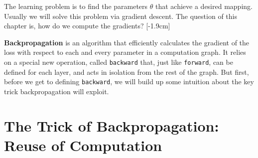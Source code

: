


The learning problem is to find the parameters {\setlength{\fboxsep}{2pt}\colorbox{comp_graph_param_bcolor}{$\theta$}} that achieve a desired mapping. Usually we will solve this problem via gradient descent. The question of this chapter is, how do we compute the gradients?
[-1.9cm]

\textbf{Backpropagation} is an algorithm that efficiently calculates the gradient of the loss with respect to each and every parameter in a computation graph. It relies on a special new operation, called \texttt{backward} that, just like \texttt{forward}, can be defined for each layer, and acts in isolation from the rest of the graph. But first, before we get to defining \texttt{backward}, we will build up some intuition about the key trick backpropagation will exploit.

\section{The Trick of Backpropagation: Reuse of Computation}

